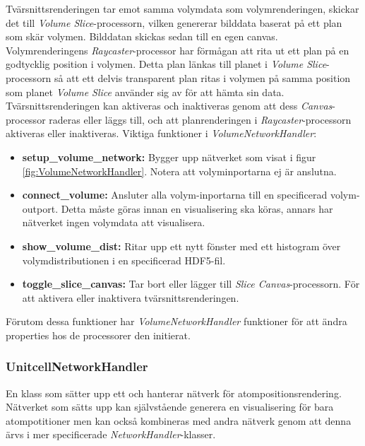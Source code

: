 Tvärsnittsrenderingen tar emot samma volymdata som volymrenderingen, skickar det till \textit{Volume Slice}-processorn, vilken genererar bilddata baserat på ett plan som skär volymen. Bilddatan skickas sedan till en egen canvas. Volymrenderingens \textit{Raycaster}-processor har förmågan att rita ut ett plan på en godtycklig position i volymen. Detta plan länkas till planet i \textit{Volume Slice}-processorn så att ett delvis transparent plan ritas i volymen på samma position som planet \textit{Volume Slice} använder sig av för att hämta sin data. Tvärsnittsrenderingen kan aktiveras och inaktiveras genom att dess \textit{Canvas}-processor raderas eller läggs till, och att planrenderingen i \textit{Raycaster}-processorn aktiveras eller inaktiveras.
\newpage
Viktiga funktioner i \textit{VolumeNetworkHandler}:
\begin{itemize}
    \setlength\itemsep{0em}
    \item \textbf{setup\_volume\_network: } Bygger upp nätverket som visat i figur \ref{fig:VolumeNetworkHandler}. Notera att volyminportarna ej är anslutna.
    \item \textbf{connect\_volume: } Ansluter alla volym-inportarna till en specificerad volym-outport. Detta måste göras innan en visualisering ska köras, annars har nätverket ingen volymdata att visualisera.
    \item \textbf{show\_volume\_dist: } Ritar upp ett nytt fönster med ett histogram över volymdistributionen i en specificerad HDF5-fil.
    \item \textbf{toggle\_slice\_canvas: } Tar bort eller lägger till \textit{Slice Canvas}-processorn. För att aktivera eller inaktivera tvärsnittsrenderingen.
\end{itemize}

Förutom dessa funktioner har \textit{VolumeNetworkHandler} funktioner för att ändra properties hos de processorer den initierat.

\subsubsection{UnitcellNetworkHandler}
En klass som sätter upp ett och hanterar nätverk för atompositionsrendering. Nätverket som sätts upp kan självstående generera en visualisering för bara atompotitioner men kan också kombineras med andra nätverk genom att denna ärvs i mer specificerade \textit{NetworkHandler}-klasser.


